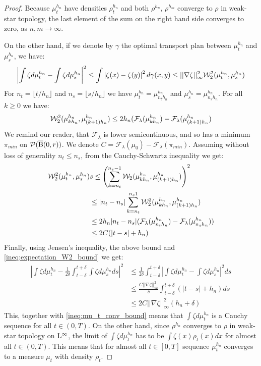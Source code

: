 \begin{proof}
Because $\mu_t^{h_n}$ have densities $\rho_t^{h_n}$ and both $\rho^{h_n}$, $\rho^{h_m}$ converge to $\rho$ in weak-star topology, the last element of the sum on the right hand side converges to zero, as $n,m \rightarrow \infty$.

On the other hand, if we denote by $\gamma$ the optimal transport plan between $\mu_t^{h_n}$ and $\mu_s^{h_n}$, we have:
\begin{equation} \label{ineq:expectation_W2_bound}
\left| \int \zeta d\mu_t^{h_n} - \int \zeta d\mu_s^{h_n} \right|^2 \leq \int \left| \zeta(x) - \zeta(y) \right|^2 d\gamma(x,y) \leq ||\nabla \zeta||_{\infty}^2 {\cal W}_2^2(\mu_t^{h_n}, \mu_s^{h_n})
\end{equation}
For $n_t = \lfloor t/h_n \rfloor$ and $n_s = \lfloor s/h_n \rfloor$ we have $\mu_t^{h_n} = \mu_{n_t h_n}^{h_n}$ and $\mu_s^{h_n} = \mu_{n_s h_n}^{h_n}$. For all $k \geq 0$ we have:
\[
{\cal W}_2^2(\mu_{kh_n}^{h_n}, \mu_{(k+1)h_n}^{h_n}) \leq 2h_n(\mathcal{F}_{\lambda}(\mu_{kh_n}^{h_n}) - \mathcal{F}_{\lambda}(\mu_{(k+1)h_n}^{h_n}) 
\]
We remind our reader, that $\mathcal{F}_{\lambda}$ is lower semicontinuous, and so has a minimum $\pi_{min}$ on $\mathcal{P}(\operatorname{\overline{B}}(0,r))$. We denote $C = \mathcal{F}_{\lambda}(\mu_0) - \mathcal{F}_{\lambda}(\pi_{min})$. Assuming without loss of generality $n_t \leq n_s$, from the Cauchy-Schwartz inequality we get:
\[
\begin{aligned}
{\cal W}_2^2(\mu_{t}^{h_n}, \mu_s^{h_n}) & s\leq \left( \sum_{k= n_t}^{n_s-1} {\cal W}_2(\mu_{kh_n}^{h_n}, \mu_{(k+1)h_n}^{h_n}) \right)^2 \\
& \leq |n_t - n_s|\sum_{k=n_t}^{n_s 1} {\cal W}_2^2(\mu_{kh_n}^{h_n}, \mu_{(k+1)h_n}^{h_n}) \\
& \leq 2h_n|n_t - n_s|(\mathcal{F}_{\lambda}(\mu_{n_t h_n}^{h_n}) - \mathcal{F}_{\lambda}(\mu_{n_s h_n}^{h_n})) \\
& \leq 2C(|t-s| + h_n)
\end{aligned}
\]
Finally, using Jensen's inequality, the above bound and \ref{ineq:expectation_W2_bound} we get:
\[
\begin{aligned}
\left| \int \zeta d\mu_t^{h_n} - \frac{1}{2\delta} \int_{t - \delta}^{t + \delta} \int \zeta d\mu_s^{h_n} ds \right|^2 & \leq \frac{1}{2\delta} \int_{t - \delta}^{t + \delta} \left| \int \zeta d\mu_{t}^{h_n} - \int \zeta d\mu_s^{h_n} \right|^2 ds \\
& \leq \frac{C ||\nabla \zeta||_{\infty}^2}{\delta} \int_{t-\delta}^{t+\delta} (|t-s| +h_n) ds \\
& \leq 2C ||\nabla \zeta||_{\infty}^2 (h_n + \delta)
\end{aligned}
\]
This, together with \ref{ineq:mu_t_conv_bound} means that $\int \zeta d\mu_t^{h_n}$ is a Cauchy sequence for all $t \in (0, T)$. On the other hand, since $\rho^{h_n}$ converges to $\rho$ in weak-star topology on $\mathrm{L}^{\infty}$, the limit of $\int \zeta d\mu_t^{h_n}$ has to be $\int \zeta(x) \rho_t(x) dx$ for almost all $t \in (0,T)$. This means that for almost all $t \in [0,T]$ sequence $\mu_{t}^{h_n}$ converges to a measure $\mu_t$ with density $\rho_t$.


\end{proof}
